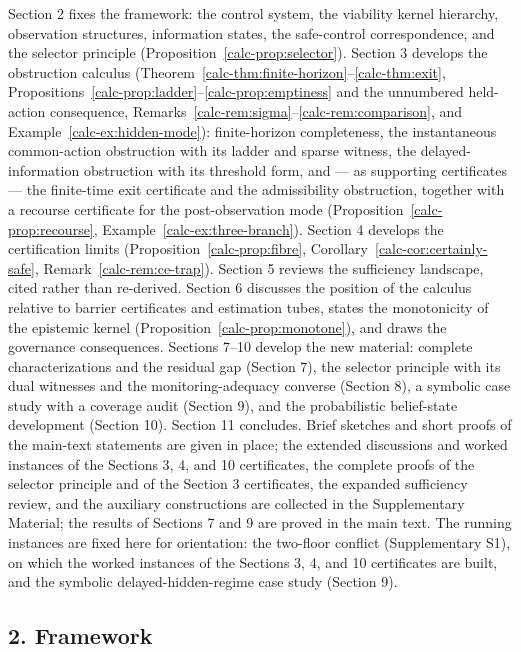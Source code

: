 \documentclass[10pt,twocolumn]{article}
\theoremstyle{definition}
\begin{document}
Section 2 fixes the framework: the control system, the viability kernel
hierarchy, observation structures, information states, the safe-control
correspondence, and the selector principle (Proposition~\ref{calc-prop:selector}). Section 3 develops the obstruction calculus (Theorem~\ref{calc-thm:finite-horizon}--\ref{calc-thm:exit}, Propositions~\ref{calc-prop:ladder}--\ref{calc-prop:emptiness} and the unnumbered held-action consequence, Remarks~\ref{calc-rem:sigma}--\ref{calc-rem:comparison}, and Example~\ref{calc-ex:hidden-mode}): finite-horizon completeness, the instantaneous common-action obstruction with its ladder and sparse witness, the delayed-information obstruction with its threshold form, and --- as supporting certificates --- the finite-time exit certificate and the admissibility obstruction, together with a recourse certificate for the post-observation mode (Proposition~\ref{calc-prop:recourse}, Example~\ref{calc-ex:three-branch}). Section 4 develops the certification limits
(Proposition~\ref{calc-prop:fibre}, Corollary~\ref{calc-cor:certainly-safe}, Remark~\ref{calc-rem:ce-trap}). Section 5 reviews the sufficiency landscape, cited rather than re-derived. Section
6 discusses the position of the calculus relative to barrier
certificates and estimation tubes, states the monotonicity of the
epistemic kernel (Proposition~\ref{calc-prop:monotone}), and draws the governance
consequences. Sections 7--10 develop the new material: complete characterizations and the residual gap (Section 7), the selector principle with its dual witnesses and the monitoring-adequacy converse (Section 8), a symbolic case study with a coverage audit (Section 9), and the probabilistic belief-state development (Section 10). Section 11 concludes. Brief sketches and short proofs of the main-text statements are given in place; the extended discussions and worked instances of the Sections 3, 4, and 10 certificates, the complete proofs of the selector principle and of the Section 3 certificates, the expanded sufficiency review, and the auxiliary constructions are collected in the Supplementary Material; the results of Sections 7 and 9 are proved in the main text. The running
instances are fixed here for orientation: the two-floor conflict
(Supplementary S1), on which the worked instances of the Sections 3, 4,
and 10 certificates are built, and the symbolic delayed-hidden-regime
case study (Section 9).



\subsection{2. Framework}\label{calc-framework}
\end{document}
